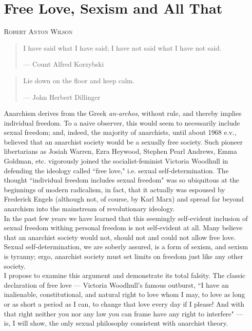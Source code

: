 \documentclass[12pt, onecolumn, letterpaper, oneside]{book}
\makeatletter
\newcommand\chapterauthor[1]{\authortoc{#1}\printchapterauthor{#1}}
\newcommand{\printchapterauthor}[1]{%
  {\parindent0pt\vspace*{-25pt}%
  \linespread{1.1}\large\scshape#1%
  \par\nobreak\vspace*{35pt}}
  \@afterheading%
}
\newcommand{\authortoc}[1]{%
  \addtocontents{toc}{\vskip-10pt}%
  \addtocontents{toc}{%
    \protect\contentsline{chapter}%
    {\hskip1.3em\mdseries\scshape\protect\scriptsize#1}{}{}}
  \addtocontents{toc}{\vskip5pt}%
}
\makeatother
\begin{document}
\chapter{Free Love, Sexism and All That}
\chapterauthor{Robert Anton Wilson}

\blockquote{I have said what I have said; I have not said what I have not said.
\par\begin{flushright} --- Count Alfred Korzybski \end{flushright}
}
\blockquote{Lie down on the floor and keep calm.
\par\begin{flushright} --- John Herbert Dillinger \end{flushright}
}

Anarchism derives from the Greek \emph{an-archos}, without rule, and thereby implies individual freedom. To a naive observer, this would seem to necessarily include sexual freedom; and, indeed, the majority of anarchists, until about 1968 e.v., believed that an anarchist society would be a sexually free society. Such pioneer libertarians as Josiah Warren, Ezra Heywood, Stephen Pearl Andrews, Emma Goldman, etc. vigorously joined the socialist-feminist Victoria Woodhull in defending the ideology called ``free love," i.e. sexual self-determination. The thought ``individual freedom includes sexual freedom" was so ubiquitous at the beginnings of modern radicalism, in fact, that it actually was espoused by Frederick Engels (although not, of course, by Karl Marx) and spread far beyond anarchism into the mainstream of revolutionary ideology.\\
In the past few years we have learned that this seemingly self-evident inclusion of sexual freedom withing personal freedom is not self-evident at all. Many believe that an anarchist society would not, should not and could not allow free love. Sexual self-determination, we are soberly assured, is a form of sexism, and sexism is tyranny; ergo, anarchist society must set limits on freedom just like any other society.\\
I propose to examine this argument and demonstrate its total falsity. The classic declaration of free love --- Victoria Woodhull's famous outburst, ``I have an inalienable, constitutional, and natural right to love whom I may, to love as long or as short a period as I can, to change that love every day if I please! And with that right neither you nor any law you can frame have any right to interfere" --- is, I will show, the only sexual philosophy consistent with anarchist theory.\\
\end{document}
